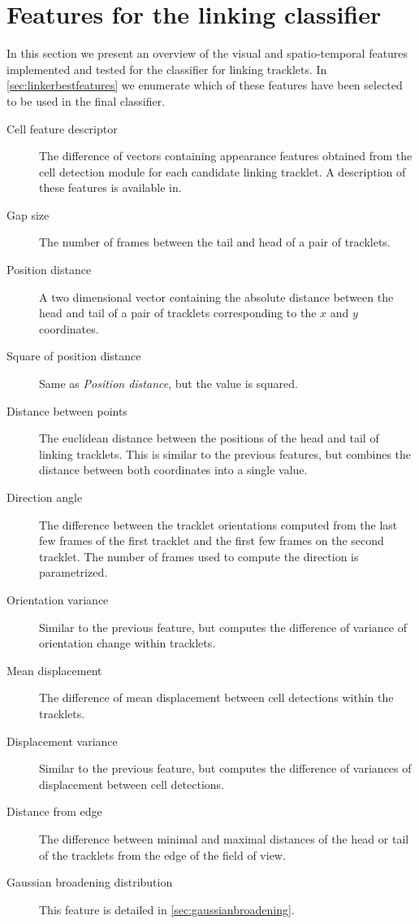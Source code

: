  	\section{Features for the linking classifier \statusoutline}
 		\label{sec:linkerclassifierfeatures}
 		
 		In this section we present an overview of the visual and spatio-temporal features implemented and tested for the classifier for linking tracklets. In \cref{sec:linkerbestfeatures} we enumerate which of these features have been selected to be used in the final classifier. 
 		
 		\begin{description}
    		\item[Cell feature descriptor] The difference of vectors containing appearance features obtained from the cell detection module for each candidate linking tracklet. A description of these features is available in. 
    		\item[Gap size] The number of frames between the tail and head of a pair of tracklets.
    		\item[Position distance] A two dimensional vector containing the absolute distance between the head and tail of a pair of tracklets corresponding to the $x$ and $y$ coordinates.
    		\item[Square of position distance] Same as \textit{Position distance}, but the value is squared.
    		\item[Distance between points] The euclidean distance between the positions of the head and tail of linking tracklets. This is similar to the previous features, but combines the distance between both coordinates into a single value.
    		\item[Direction angle] The difference between the tracklet orientations computed from the last few frames of the first tracklet and the first few frames on the second tracklet. The number of frames used to compute the direction is parametrized.
    		\item[Orientation variance] Similar to the previous feature, but computes the difference of variance of orientation change within tracklets.
    		\item[Mean displacement] The difference of mean displacement between cell detections within the tracklets.
    		\item[Displacement variance] Similar to the previous feature, but computes the difference of variances of displacement between cell detections.
    		\item[Distance from edge] The difference between minimal and maximal distances of the head or tail of the tracklets from the edge of the field of view.
    		\item[Gaussian broadening distribution] This feature is detailed in \cref{sec:gaussianbroadening}.
    	\end{description}
    	
